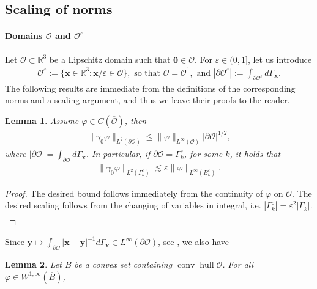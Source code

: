 \documentclass[]{article}
\newtheorem{lemma}{Lemma}
\numberwithin{equation}{section}
\numberwithin{theorem}{section}
\numberwithin{lemma}{section}
\numberwithin{corollary}{section}
\numberwithin{proposition}{section}
\numberwithin{definition}{section}
\newcommand{\bx}{\boldsymbol{x}}
\newcommand{\re}{\varepsilon}
\renewcommand{\O}{\mathcal{O}}
\renewcommand{\vec}{\boldsymbol}
\begin{document}
\begin{appendices}
		\section{Scaling of norms}	
		\paragraph{Domains  $\mathcal{O}$ and $\mathcal{O}^{\re}$} Let $\mathcal{O} \subset \mathbb{R}^3$ be a Lipschitz domain such that $\boldsymbol{0} \in \mathcal{O}$. For $\re \in (0, 1]$, let us introduce 
		\begin{align}
			\label{eq:domain_O}
			\mathcal{O}^{\re} :=  \{ \boldsymbol{x} \in \mathbb{R}^3: \boldsymbol{x}/\re  \in \mathcal{O}\}, \text{ so that }
			\mathcal{O}=\mathcal{O}^1, 
			\text{ and } |\partial\mathcal{O}^{\re}|:=\int_{\partial\mathcal{O}^{\re}}d\Gamma_{\bx}.
		\end{align}
		The following results are immediate from the definitions of the corresponding norms and a scaling argument, and thus we leave their proofs to the reader. 
		\begin{lemma}
			\label{lem:norml2}
			Assume $\varphi\in C(\overline{\mathcal{O}})$, then
			\begin{align*}%
				\|\gamma_0 \varphi\|_{L^2( \partial \mathcal{O})}\leq  \|\varphi\|_{L^{\infty}(\mathcal{O})} |\partial \mathcal{O} |^{1/2},
			\end{align*}
			where $|\partial \mathcal{O} | = \int_{\partial \mathcal{O}} d\Gamma_{\bx}$. In particular, if $\partial\mathcal{O}=\Gamma^{\re}_k$, for some $k$, it holds that 
			\begin{align*}
				\| \gamma_0 \varphi \|_{L^2(\Gamma^{\re}_k)} \lesssim \varepsilon \|\varphi\|_{L^{\infty}(B^{\re}_k)}.
			\end{align*}
		\end{lemma}
		\begin{proof}
			The desired bound follows immediately from the continuity of $\varphi$ on $\overline{\O}$. The desired scaling follows from the changing of variables in integral, i.e. $|\Gamma^{\re}_k | = \re^2 |\Gamma_k| $.
			\begin{align*}
			\end{align*}
		\end{proof}
		Since  $\vec{y}\mapsto\int_{\partial\mathcal{O}}|\vec{x}-\vec{y}|^{-1}d\Gamma_{\vec{x}}\in L^{\infty}(\partial\mathcal{O})$,  see \cite[Theorem 3.3.5]{sauter_schwab}, we also have
		\begin{lemma}
			\label{lem:normh12}
			Let $B$ be a convex set containing  $\operatorname{conv}\operatorname{hull}\mathcal{O}$.  For all $\varphi\in W^{1,\infty}(\overline{{B}})$,  

\end{lemma}
\end{appendices}
\end{document}
